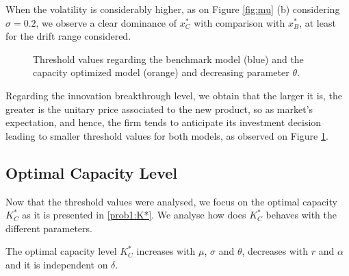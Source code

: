 When the volatility is considerably higher, as on Figure \ref{fig:mu} (b) considering $\sigma=0.2$, we observe a clear dominance of $x^*_C$ with comparison with $x^*_B$, at least for the drift range considered.







\begin{figure}[!htb]
	\centering
	\caption{Threshold values regarding the benchmark model (blue) and the capacity optimized model (orange) and decreasing parameter $\theta$.}
	\label{fig:td}
\end{figure}

Regarding the innovation breakthrough level, we obtain that the larger it is, the greater is the unitary price associated to the new product, so as market's expectation, and hence, the firm tends to anticipate its investment decision leading to smaller threshold values for both models, as observed on Figure \ref{fig:td}.



\subsection{Optimal Capacity Level}

Now that the threshold values were analysed, we focus on the optimal capacity $K^*_C$ as it is presented in \eqref{prob1:K*}. We analyse how does $K_C^*$ behaves with the different parameters.

\begin{prop}
	\label{1_prop3}
The optimal capacity level $K^*_C$ increases with $\mu$, $\sigma$ and $\theta$, decreases with $r$ and $\alpha$ and it is independent on $\delta$.
\end{prop}


